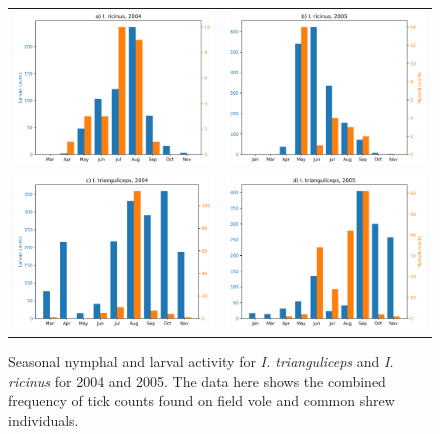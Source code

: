 \documentclass{article}
\begin{document}
\begin{figure}
	\centering
	\begin{tabular}{ll}
		\includegraphics[width=.5\linewidth,valign=m]{A) I. ricinus, 2004} & \includegraphics[width=.5\linewidth,valign=m]{B) I. ricinus, 2005} \\
		\includegraphics[width=.5\linewidth,valign=m]{C) I. trianguliceps, 2004} & \includegraphics[width=.5\linewidth,valign=m]{D) I. trianguliceps, 2005} \\
	\end{tabular}
	\caption{ Seasonal nymphal and larval activity for \textit{I. trianguliceps} and \textit{I. ricinus} for 2004 and 2005. The data here shows the combined frequency of tick counts found on field vole and common shrew individuals.}
	\label{fig:kielder_seasonal}
\end{figure}
\end{document}
